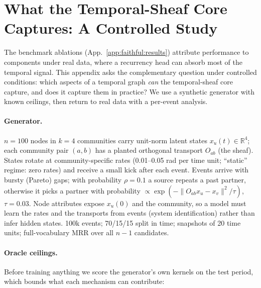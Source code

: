 \section{What the Temporal-Sheaf Core Captures: A Controlled Study}
\label{app:analytic}

The benchmark ablations (App.~\ref{app:faithful:results}) attribute
performance to components under real data, where a recurrency head can
absorb most of the temporal signal. This appendix asks the complementary
question under controlled conditions: which aspects of a temporal graph
\emph{can} the temporal-sheaf core capture, and does it capture them in
practice? We use a synthetic generator with known ceilings, then return to
real data with a per-event analysis.

\paragraph{Generator.}
$n{=}100$ nodes in $k{=}4$ communities carry unit-norm latent states
$x_u(t)\in\mathbb{R}^4$; each community pair $(a,b)$ has a planted
orthogonal transport $O_{ab}$ (the sheaf). States rotate at
community-specific rates (0.01--0.05 rad per time unit; ``static'' regime:
zero rates) and receive a small kick after each event. Events arrive with
bursty (Pareto) gaps; with probability $\rho{=}0.1$ a source repeats a past
partner, otherwise it picks a partner with probability
$\propto\exp(-\|O_{ab}x_u-x_v\|^2/\tau)$, $\tau{=}0.03$. Node attributes
expose $x_u(0)$ and the community, so a model must learn the rates and the
transports from events (system identification) rather than infer hidden
states. 100k events; 70/15/15 split in time; snapshots of 20 time units;
full-vocabulary MRR over all $n{-}1$ candidates.

\paragraph{Oracle ceilings.}
Before training anything we score the generator's own kernels on the test
period, which bounds what each mechanism can contribute:

